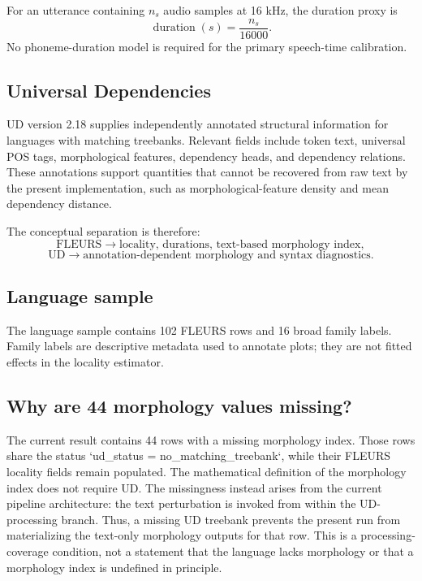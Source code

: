\documentclass[11pt]{article}
\begin{document}
For an utterance containing $n_s$ audio samples at 16 kHz, the duration proxy is
\[
\operatorname{duration}(s)=\frac{n_s}{16000}.
\]
No phoneme-duration model is required for the primary speech-time calibration.

\subsection{Universal Dependencies}
UD version 2.18 supplies independently annotated structural information for languages with matching treebanks. Relevant fields include token text, universal POS tags, morphological features, dependency heads, and dependency relations. These annotations support quantities that cannot be recovered from raw text by the present implementation, such as morphological-feature density and mean dependency distance.

The conceptual separation is therefore:
\[
\text{FLEURS}\rightarrow \text{locality, durations, text-based morphology index},
\]
\[
\text{UD}\rightarrow \text{annotation-dependent morphology and syntax diagnostics}.
\]

\subsection{Language sample}
The language sample contains 102 FLEURS rows and 16 broad family labels. Family labels are descriptive metadata used to annotate plots; they are not fitted effects in the locality estimator.

\begin{table}[H]\centering
\caption{Family-level structural-annotation coverage in the current result.}\label{tab:family}

\end{table}

\subsection{Why are 44 morphology values missing?}
The current result contains 44 rows with a missing morphology index. Those rows share the status `ud\_status = no\_matching\_treebank`, while their FLEURS locality fields remain populated. The mathematical definition of the morphology index does not require UD. The missingness instead arises from the current pipeline architecture: the text perturbation is invoked from within the UD-processing branch. Thus, a missing UD treebank prevents the present run from materializing the text-only morphology outputs for that row. This is a processing-coverage condition, not a statement that the language lacks morphology or that a morphology index is undefined in principle.
\end{document}
